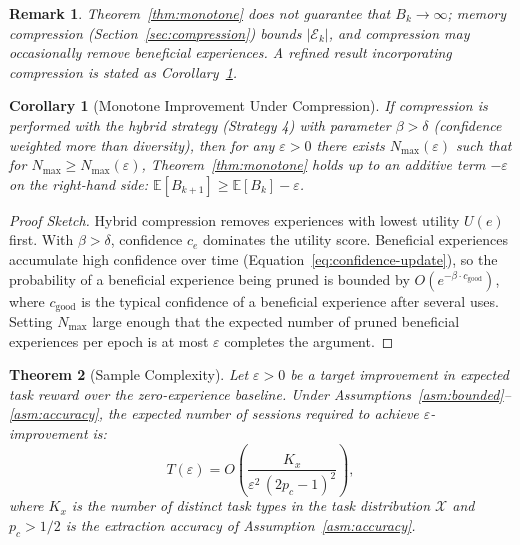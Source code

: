 \documentclass[11pt]{article}
\newtheorem{theorem}{Theorem}
\newtheorem{corollary}[theorem]{Corollary}
\newtheorem{remark}{Remark}
\begin{document}
\begin{remark}
Theorem~\ref{thm:monotone} does not guarantee that $B_k \to \infty$;
memory compression (Section~\ref{sec:compression}) bounds $|\mathcal{E}_k|$,
and compression may occasionally remove beneficial experiences. A refined
result incorporating compression is stated as Corollary~\ref{cor:compressed}.
\end{remark}

\begin{corollary}[Monotone Improvement Under Compression]
\label{cor:compressed}
If compression is performed with the hybrid strategy (Strategy 4) with
parameter $\beta > \delta$ (confidence weighted more than diversity), then
for any $\varepsilon > 0$ there exists $N_{\max}(\varepsilon)$ such that for
$N_{\max} \geq N_{\max}(\varepsilon)$, Theorem~\ref{thm:monotone} holds up
to an additive term $-\varepsilon$ on the right-hand side:
$\mathbb{E}[B_{k+1}] \geq \mathbb{E}[B_k] - \varepsilon$.
\end{corollary}

\begin{proof}[Proof Sketch]
Hybrid compression removes experiences with lowest utility $U(e)$ first. With
$\beta > \delta$, confidence $c_e$ dominates the utility score. Beneficial
experiences accumulate high confidence over time (Equation~\eqref{eq:confidence-update}),
so the probability of a beneficial experience being pruned is bounded by
$O(e^{-\beta \cdot c_{\text{good}}})$, where $c_{\text{good}}$ is the typical
confidence of a beneficial experience after several uses. Setting $N_{\max}$
large enough that the expected number of pruned beneficial experiences per
epoch is at most $\varepsilon$ completes the argument.
\end{proof}

\begin{theorem}[Sample Complexity]
\label{thm:sample}
Let $\varepsilon > 0$ be a target improvement in expected task reward over the
zero-experience baseline. Under Assumptions~\ref{asm:bounded}--\ref{asm:accuracy},
the expected number of sessions required to achieve $\varepsilon$-improvement is:
\begin{equation}
    T(\varepsilon) = O\!\left(\frac{K_x}{\varepsilon^2\,(2p_c - 1)^2}\right),
    \label{eq:sample-complexity}
\end{equation}
where $K_x$ is the number of distinct task types in the task distribution
$\mathcal{X}$ and $p_c > 1/2$ is the extraction accuracy of Assumption~\ref{asm:accuracy}.
\end{theorem}
\end{document}
